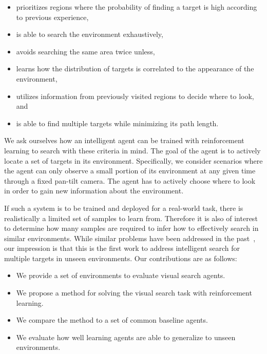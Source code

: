\begin{itemize}
  \item prioritizes regions where the probability of finding a target is high according to previous experience,
  \item is able to search the environment exhaustively,
  \item avoids searching the same area twice unless,
  \item learns how the distribution of targets is correlated to the appearance of the environment,
  \item utilizes information from previously visited regions to decide where to look, and
  \item is able to find multiple targets while minimizing its path length. %
\end{itemize}

We ask ourselves how an intelligent agent can be trained with reinforcement learning to search with these criteria in mind.
The goal of the agent is to actively locate a set of targets in its environment.
Specifically, we consider scenarios where the agent can only observe a small portion of its environment at any given time through a fixed pan-tilt camera.
The agent has to actively choose where to look in order to gain new information about the environment.

If such a system is to be trained and deployed for a real-world task, there is realistically a limited set of samples to learn from.
Therefore it is also of interest to determine how many samples are required to infer how to effectively search in similar environments.
While similar problems have been addressed in the past~\cite{minut_mahadevan_2001,mirowski_navigate_2017}, our impression is that this is the first work to address intelligent search for multiple targets in unseen environments.
Our contributions are as follows:

\begin{itemize}
  \item We provide a set of environments to evaluate visual search agents.
  \item We propose a method for solving the visual search task with reinforcement learning.
  \item We compare the method to a set of common baseline agents.
  \item We evaluate how well learning agents are able to generalize to unseen environments.
\end{itemize}

